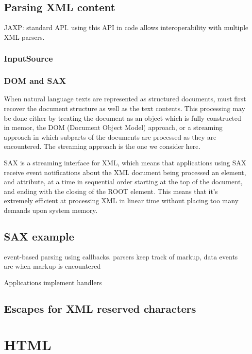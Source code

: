 \subsection{Parsing XML content}

JAXP: standard API.  using this API in code allows interoperability with multiple XML parsers.

\subsubsection{InputSource}


\subsubsection{DOM and SAX}

When natural language texts are represented as structured documents,
must first recover the document structure as well as the text contents.
This processing may be done either by treating the document as an object
which is fully constructed in memor, the DOM (Document Object Model) approach,
or a streaming approach in which subparts of the documents are processed as
they are encountered.  The streaming approach is the one we consider here.



SAX is a streaming interface for XML, which means that applications using SAX receive event notifications about the XML document being processed an element, and attribute, at a time in sequential order starting at the top of the document, and ending with the closing of the ROOT element. This means that it’s extremely efficient at processing XML in linear time without placing too many demands upon system memory.


\subsection{SAX example}


event-based parsing using callbacks.
parsers keep track of markup, data
events are when markup is encountered

Applications implement handlers 

\subsection{Escapes for XML reserved characters}


\section{HTML}

